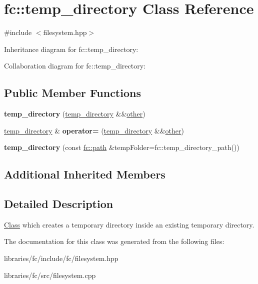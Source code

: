 \hypertarget{classfc_1_1temp__directory}{}\section{fc\+:\+:temp\+\_\+directory Class Reference}
\label{classfc_1_1temp__directory}


{\ttfamily \#include $<$filesystem.\+hpp$>$}



Inheritance diagram for fc\+:\+:temp\+\_\+directory\+:


Collaboration diagram for fc\+:\+:temp\+\_\+directory\+:
\subsection*{Public Member Functions}
\begin{DoxyCompactItemize}
\item 
\mbox{\label{classfc_1_1temp__directory_acba404aa7b5eaa97376d006abe3b06c5}} 
{\bfseries temp\+\_\+directory} (\mbox{\hyperlink{classfc_1_1temp__directory}{temp\+\_\+directory}} \&\&\mbox{\hyperlink{structother}{other}})
\item 
\mbox{\label{classfc_1_1temp__directory_acc19b932765f7e89457b6936ae4a9060}} 
\mbox{\hyperlink{classfc_1_1temp__directory}{temp\+\_\+directory}} \& {\bfseries operator=} (\mbox{\hyperlink{classfc_1_1temp__directory}{temp\+\_\+directory}} \&\&\mbox{\hyperlink{structother}{other}})
\item 
\mbox{\label{classfc_1_1temp__directory_a48c295b6996e5e87a7a05e7003a0dbcb}} 
{\bfseries temp\+\_\+directory} (const \mbox{\hyperlink{classfc_1_1path}{fc\+::path}} \&temp\+Folder=fc\+::temp\+\_\+directory\+\_\+path())
\end{DoxyCompactItemize}
\subsection*{Additional Inherited Members}


\subsection{Detailed Description}
\mbox{\hyperlink{class_class}{Class}} which creates a temporary directory inside an existing temporary directory. 

The documentation for this class was generated from the following files\+:\begin{DoxyCompactItemize}
\item 
libraries/fc/include/fc/filesystem.\+hpp\item 
libraries/fc/src/filesystem.\+cpp\end{DoxyCompactItemize}
